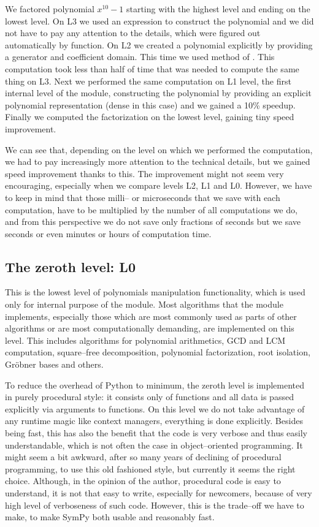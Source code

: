 \noindent
We factored polynomial $x^{10} - 1$ starting with the highest level and ending on the lowest
level. On L3 we used an expression to construct the polynomial and we did not have to pay any
attention to the details, which were figured out automatically by  function.
On L2 we created a polynomial explicitly by providing a generator and coefficient domain. This
time we used  method of . This computation took less than half
of time that was needed to compute the same thing on L3. Next we performed the same computation
on L1 level, the first internal level of the module, constructing the polynomial by providing
an explicit polynomial representation (dense in this case) and we gained a 10\% speedup. Finally
we computed the factorization on the lowest level, gaining tiny speed improvement.

We can see that, depending on the level on which we performed the computation, we had to pay
increasingly more attention to the technical details, but we gained speed improvement thanks
to this. The improvement might not seem very encouraging, especially when we compare levels
L2, L1 and L0. However, we have to keep in mind that those milli-- or microseconds that we
save with each computation, have to be multiplied by the number of all computations we do,
and from this perspective we do not save only fractions of seconds but we save seconds or
even minutes or hours of computation time.


\subsection{The zeroth level: L0}

This is the lowest level of polynomials manipulation functionality, which is used only for internal
purpose of the module. Most algorithms that the module implements, especially those which are most
commonly used as parts of other algorithms or are most computationally demanding, are implemented
on this level. This includes algorithms for polynomial arithmetics, GCD and LCM computation,
square--free decomposition, polynomial factorization, root isolation, Gröbner bases and others.

To reduce the overhead of Python to minimum, the zeroth level is implemented in purely procedural
style: it consists only of functions and all data is passed explicitly via arguments to functions.
On this level we do not take advantage of any runtime magic like context managers, everything is
done explicitly. Besides being fast, this has also the benefit that the code is very verbose and
thus easily understandable, which is not often the case in object--oriented programming. It might
seem a bit awkward, after so many years of declining of procedural programming, to use this old
fashioned style, but currently it seems the right choice. Although, in the opinion of the author,
procedural code is easy to understand, it is not that easy to write, especially for newcomers,
because of very high level of verboseness of such code. However, this is the trade--off we have
to make, to make SymPy both usable and reasonably fast.

